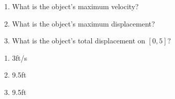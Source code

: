 {\noindent
\begin{minipage}{\linewidth}
\end{minipage}
\begin{enumerate}
\item		What is the object's maximum velocity?
\item		What is the object's maximum displacement?
\item		What is the object's total displacement on $[0,5]$?
\end{enumerate}

}
{\begin{enumerate}
\item		3ft/s
\item		9.5ft
\item		9.5ft
\end{enumerate}
}

